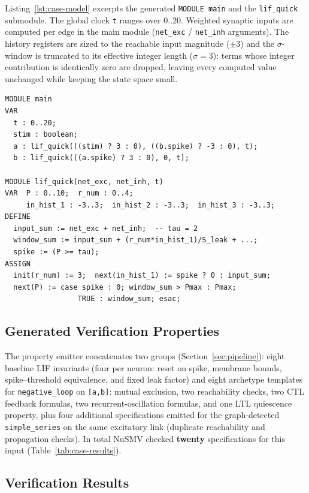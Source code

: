 \documentclass[
]{ceurart}
\begin{document}
Listing~\ref{lst:case-model} excerpts the generated \texttt{MODULE main}
and the \texttt{lif\_quick} submodule. The global clock \texttt{t} ranges
over $0..20$. Weighted synaptic inputs are computed per edge in the main
module (\texttt{net\_exc} / \texttt{net\_inh} arguments). The history
registers are sized to the reachable input magnitude ($\pm 3$) and the
$\sigma$-window is truncated to its effective integer length ($\sigma = 3$):
terms whose integer contribution is identically zero are dropped, leaving
every computed value unchanged while keeping the state space small.

\begin{lstlisting}[style=smvcode,caption={Excerpt of generated \texttt{model.smv} (case study).},label=lst:case-model]
MODULE main
VAR
  t : 0..20;
  stim : boolean;
  a : lif_quick(((stim) ? 3 : 0), ((b.spike) ? -3 : 0), t);
  b : lif_quick(((a.spike) ? 3 : 0), 0, t);

MODULE lif_quick(net_exc, net_inh, t)
VAR  P : 0..10;  r_num : 0..4;
     in_hist_1 : -3..3;  in_hist_2 : -3..3;  in_hist_3 : -3..3;
DEFINE
  input_sum := net_exc + net_inh;  -- tau = 2
  window_sum := input_sum + (r_num*in_hist_1)/S_leak + ...;
  spike := (P >= tau);
ASSIGN
  init(r_num) := 3;  next(in_hist_1) := spike ? 0 : input_sum;
  next(P) := case spike : 0; window_sum > Pmax : Pmax;
                 TRUE : window_sum; esac;
\end{lstlisting}

\subsection{Generated Verification Properties}
\label{subsec:case-properties}

The property emitter concatenates two groups (Section~\ref{sec:pipeline}):
eight baseline LIF invariants (four per neuron: reset on spike, membrane
bounds, spike--threshold equivalence, and fixed leak factor) and eight
archetype templates for \texttt{negative\_loop} on \texttt{[a,b]}: mutual
exclusion, two reachability checks, two CTL feedback formulas, two
recurrent-oscillation formulas, and one LTL quiescence property, plus four
additional specifications emitted for the graph-detected
\texttt{simple\_series} on the same excitatory link (duplicate reachability
and propagation checks). In total NuSMV checked \textbf{twenty}
specifications for this input (Table~\ref{tab:case-results}).

\subsection{Verification Results}
\label{subsec:case-results}
\end{document}
